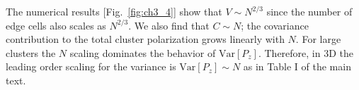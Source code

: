 The numerical results [Fig.\ \ref{fig:ch3_4}] show that $V \sim N^{2/3}$ since the number of edge cells also scales as $N^{2/3}$. We also find that $C \sim N$; the covariance contribution to the total cluster polarization grows linearly with $N$. For large clusters the $N$ scaling dominates the behavior of $\text{Var}[P_z]$. Therefore, in 3D the leading order scaling for the variance is
$\text{Var}[P_z] \sim N$ as in Table I of the main text.


%

%
